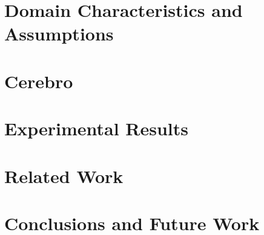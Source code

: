 

\section{Domain Characteristics and Assumptions}
\label{sec:cerebro_approach}



\section{Cerebro}
\label{sec:cerebro_design}


\section{Experimental Results}
\label{sec:cerebro_results}


\section{Related Work}
\label{sec:cerebro_related_work}


\section{Conclusions and Future Work}
\label{sec:cerebro_conclusions}

